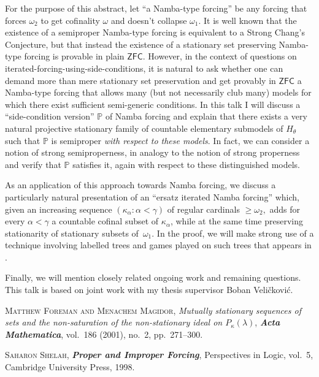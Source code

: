 \documentclass[bsl,meeting]{asl}
\newcommand{\NP}{}
\begin{document}
\thispagestyle{empty}

\NP  
{}

For the purpose of this abstract, let ``a Namba-type forcing'' be any forcing that forces $\omega_2$ to get cofinality $\omega$ and doesn't collapse $\omega_1.$
It is well known that the existence of a semiproper Namba-type forcing is equivalent to a Strong Chang's Conjecture, but that instead the existence of a stationary set preserving Namba-type forcing is provable in plain $\mathsf{ZFC}.$ However, in the context of questions on iterated-forcing-using-side-conditions, it is natural to ask whether one can demand more than mere stationary set preservation and get provably in $\mathsf{ZFC}$ a Namba-type forcing that allows many (but not necessarily club many) models for which there exist sufficient semi-generic conditions.
In this talk I will discuss a ``side-condition version'' $\mathbb{P}$ of Namba forcing and explain that there exists a very natural projective stationary family of countable elementary submodels of $H_\theta$ such that  $\mathbb{P}$ is semiproper \emph{with respect to these models}. In fact, we can consider a notion of strong semiproperness, in analogy to the notion of strong properness and verify that $\mathbb{P}$ satisfies it, again with respect to these distinguished models.

As an application of this approach towards Namba forcing, we discuss a particularly natural presentation of an ``ersatz iterated Namba forcing'' which, given an increasing sequence $(\kappa_\alpha : \alpha < \gamma)$ of regular cardinals $\geq \omega_2,$ adds for every $\alpha < \gamma$ a countable cofinal subset of $\kappa_\alpha$, while at the same time preserving stationarity of stationary subsets of~$\omega_1.$ In the proof, we will make strong use of a technique involving labelled trees and games played on such trees that appears in \cite{cite1}.

Finally, we will mention closely related ongoing work and remaining questions.\\
This talk is based on joint work with my thesis supervisor Boban Veli\v{c}kovi\'c.


\begin{thebibliography}{10}

{\scshape Matthew Foreman and Menachem Magidor},
{\itshape Mutually stationary sequences of sets and the non-saturation of the non-stationary ideal on $P_\kappa(\lambda)$},
{\bfseries\itshape Acta Mathematica},
vol.~186 (2001), no.~2, pp.~271--300.

{\scshape Saharon Shelah},
{\bfseries\itshape Proper and Improper Forcing},
Perspectives in Logic, vol.~5,
Cambridge University Press,
1998.

\end{thebibliography}

\vspace*{-0.5\baselineskip}
\end{document}
